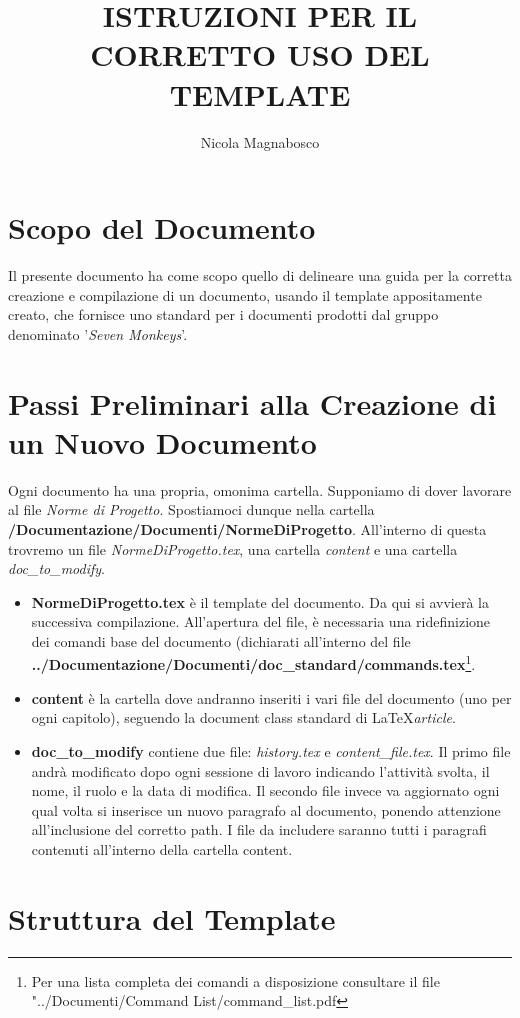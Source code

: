 \documentclass[10pt]{article}
\title{ISTRUZIONI PER IL CORRETTO USO DEL TEMPLATE}
\author{Nicola Magnabosco}
\begin{document}
	\maketitle
	\section{Scopo del Documento}
	Il presente documento ha come scopo quello di delineare una guida per la corretta creazione e compilazione di un documento, usando il template appositamente creato, che fornisce uno standard per i documenti prodotti dal gruppo denominato '\textit{Seven Monkeys}'.
	\section{Passi Preliminari alla Creazione di un Nuovo Documento}
	Ogni documento ha una propria, omonima cartella. Supponiamo di dover lavorare al file \textit{Norme di Progetto}.
	Spostiamoci dunque nella cartella \textbf{/Documentazione/Documenti/NormeDiProgetto}. All'interno di questa trovremo un file \textit{NormeDiProgetto.tex}, una cartella \textit{content} e una cartella \textit{doc\_to\_modify}.
	\begin{itemize}
		\item \textbf{NormeDiProgetto.tex} è il template del documento. Da qui si avvierà la successiva compilazione. All'apertura del file, è necessaria una ridefinizione dei comandi base del documento (dichiarati all'interno del file \textbf{../Documentazione/Documenti/doc\_standard/commands.tex}\footnote{Per una lista completa dei comandi a disposizione consultare il file "../Documenti/Command List/command\_list.pdf}.
		\item \textbf{content} è la cartella dove andranno inseriti i vari file del documento (uno per ogni capitolo), seguendo la document class standard di \LaTeX \textit{article}.
		\item \textbf{doc\_to\_modify} contiene due file: \textit{history.tex} e \textit{content\_file.tex}. Il primo file andrà modificato dopo ogni sessione di lavoro indicando l'attività svolta, il nome, il ruolo e la data di modifica. Il secondo file invece va aggiornato ogni qual volta si inserisce un nuovo paragrafo al documento, ponendo attenzione all'inclusione del corretto path. I file da includere saranno tutti i paragrafi contenuti all'interno della cartella content.
	\end{itemize}
	\section{Struttura del Template}
	
\end{document}
